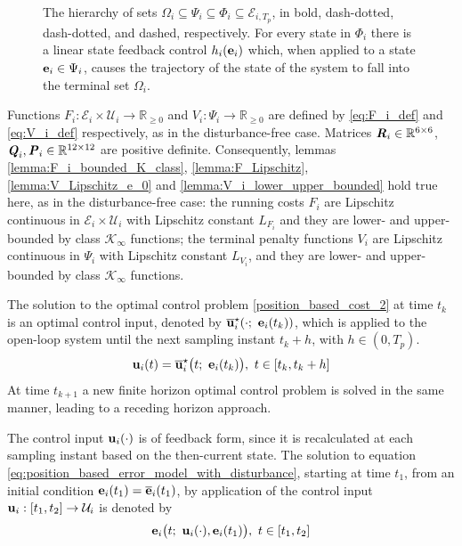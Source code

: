 \begin{figure}[ht!]
  \centering
  
  \caption{The hierarchy of sets
  $\Omega_i \subseteq \Psi_i \subseteq \Phi_i \subseteq \mathcal{E}_{i,T_p}$,
  in bold, dash-dotted, dash-dotted, and dashed, respectively.
  For every state in $\Phi_i$ there is a linear state feedback control
  $h_i(\bm{\mathbf{e}}_i)$ which, when applied to a state
  $\bm{\mathbf{e}}_i \in \Psi_i$, causes the trajectory of the state of the system to
  fall into the terminal set $\Omega_i$.}
\end{figure}


Functions
$F_i : \mathcal{E}_i \times \mathcal{U}_i \to \mathbb{R}_{\geq 0}$ and
$V_i: \Psi_i \to \mathbb{R}_{\geq 0}$ are defined by \eqref{eq:F_i_def}
and \eqref{eq:V_i_def} respectively, as in the disturbance-free case.
Matrices $\bm{\mathit{R}}_i \in \mathbb{R}^{6 \times 6}$,
$\bm{\mathit{Q}}_i, \bm{\mathit{P}}_i \in \mathbb{R}^{12 \times 12}$ are positive definite.
Consequently, lemmas \eqref{lemma:F_i_bounded_K_class},
\eqref{lemma:F_Lipschitz}, \eqref{lemma:V_Lipschitz_e_0} and
\eqref{lemma:V_i_lower_upper_bounded} hold true here, as in the
disturbance-free case: the running costs $F_i$ are Lipschitz continuous in
$\mathcal{E}_i \times \mathcal{U}_i$ with Lipschitz constant $L_{F_i}$ and
they are lower- and upper-bounded by class $\mathcal{K}_{\infty}$ functions;
the terminal penalty functions $V_i$ are Lipschitz continuous in $\Psi_i$
with Lipschitz constant $L_{V_i}$, and they are lower- and upper-bounded
by class $\mathcal{K}_{\infty}$ functions.


The solution to the optimal control problem \eqref{position_based_cost_2}
at time $t_k$ is an optimal control input, denoted by
$\overline{\bm{\mathbf{u}}}_i^{\star}(\cdot;\ \bm{\mathbf{e}}_i(t_k))$, which
is applied to the open-loop system until the next sampling instant $t_k + h$,
with $h \in (0,T_p)$.
\begin{align}
  \bm{\mathbf{u}}_i(t) = \overline{\bm{\mathbf{u}}}_i^{\star}\big(t;\ \bm{\mathbf{e}}_i(t_k)\big),\  t \in [t_k, t_k + h]
 \label{eq:position_based_optimal_u_2}
\end{align}
At time $t_{k+1}$ a new finite horizon optimal control problem is solved in the
same manner, leading to a receding horizon approach.

The control input $\bm{\mathbf{u}}_i(\cdot)$ is of feedback form,
since it is recalculated at each sampling instant based on the then-current
state. The solution to equation \eqref{eq:position_based_error_model_with_disturbance}, starting at time
$t_1$, from an initial condition $\bm{\mathbf{e}}_i(t_1) = \overline{\bm{\mathbf{e}}}_i(t_1)$,
by application of the control input $\bm{\mathbf{u}}_i : [t_1, t_2] \to \mathcal{U}_i$
is denoted by
\begin{align}
  \bm{\mathbf{e}}_i\big(t;\ \bm{\mathbf{u}}_i(\cdot), \bm{\mathbf{e}}_i(t_1)\big),\ t \in [t_1, t_2]
\end{align}

